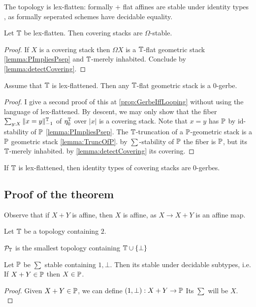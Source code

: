 \begin{example}
	The \etale topology is lex-flatten:
	formally \etale $+$ flat affines are stable under identity types , as formally \etale seperated schemes have decidable equality.  %
\end{example}

\begin{prop}{\label{prop:LexflattenOmegaStable}}
	Let $\mathbb{T}$ be lex-flatten. Then covering stacks are $\Omega$-stable. %
\end{prop}
\begin{proof}
	If $X$ is a covering stack then $\Omega X$ is a $\mathbb{T}$-flat geometric stack \ref{lemma:PImpliesPsep} and $\mathbb{T}$-merely inhabited. Conclude by  \ref{lemma:detectCovering}.
\end{proof}
\begin{lemma}{\label{lemma:TflatIs0-gerbe}}
	Assume that $\mathbb{T}$ is lex-flattened. Then any $\mathbb{T}$-flat geometric stack is a 0-gerbe.
\end{lemma}
\begin{proof}
	I give a second proof of this at \ref{prop:GerbeIffLooping} without using the language of lex-flattened.
	By descent, we may only show that the fiber $\sum_{y: X} \|x = y\|_{-1}^{\mathbb{T}}$ of $\eta_0^{\mathbb{T}}$ over $|x|$ is a covering stack. Note that $x = y$ has $\mathbb{P}$ by id-stability of $\mathbb{P}$ \ref{lemma:PImpliesPsep}. The $\mathbb{T}$-truncation of a $\mathbb{P}$-geometric stack is a $\mathbb{P}$ geometric stack \ref{lemma:TruncOfP}. by $\sum$-stability of $\mathbb{P}$ the fiber is $\mathbb{P}$, but its $\mathbb{T}$-merely inhabited. by \ref{lemma:detectCovering} its covering.
\end{proof}
\begin{corollary}
	If $\mathbb{T}$ is lex-flattened, then identity types of covering stacks are 0-gerbes.
\end{corollary}
\subsection{Proof of the theorem}
 Observe that if $X + Y$ is affine, then $X$ is affine, as $X \to X + Y$ is an affine map.

Let $\mathbb{T}$ be a topology containing $2$.%
\begin{definition}
	$\mathcal{P}_{\mathbb{T}}$ is the smallest topology containing $\mathbb{T} \cup \{\bot\}$
\end{definition}
\begin{lemma}{\label{lemma:SummandStable}}
	Let $\mathbb{P}$ be $\sum$ stable containing $1 , \bot$. Then its stable under decidable subtypes, i.e. If $X + Y \in \mathbb{P}$ then $X \in \mathbb{P}$.
\end{lemma}
\begin{proof}
	Given $X + Y \in \mathbb{P}$, we can define $(1, \bot) : X + Y \to \mathbb{P}$ Its $\sum$ will be $X$. \\
\end{proof}


